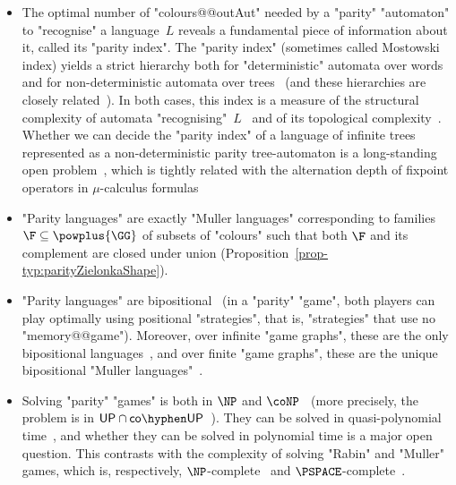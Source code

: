 \documentclass{theoretics}
\begin{document}
\begin{itemize}
	\item The optimal number of "colours@@outAut" needed by a "parity" "automaton"  to "recognise" a language~$L$ reveals a fundamental piece of information about it, called its "parity index". 
	The "parity index" (sometimes called Mostowski index) yields a strict hierarchy both for "deterministic" automata over words and for non-deterministic automata over trees~\cite{Niwinski86Clones,Bradfield98MuHierarchy} (and these hierarchies are closely related~\cite{KSV96Relating,NiwinskiWalukievicz1998Relating}).
	In both cases, this index is a measure of the structural complexity of automata "recognising"~$L$~\cite{Wagner1979omega,NiwinskiWalukievicz1998Relating} and of its topological complexity~\cite{ADMN08Topological, Skrzypczak13Topological}.
	Whether we can decide the "parity index" of a language of infinite trees represented as a non-deterministic parity tree-automaton is a long-standing open problem~\cite{NW05DecidingHierarchy,CL08MostwHierarchy}, which is tightly related with the alternation depth of fixpoint operators in $\mu$-calculus formulas~\cite{Niwinski86Clones}
	
	\item "Parity languages" are exactly "Muller languages" corresponding to families $\F\subseteq \powplus{\GG}$ of subsets of "colours" such that both $\F$ and its complement are closed under union (Proposition~\ref{prop-typ:parityZielonkaShape}).
	\item "Parity languages" are bipositional~\cite{EmersonJutla91Determinacy} (in a "parity" "game", both players can play optimally using positional "strategies", that is, "strategies" that use no "memory@@game"). Moreover, over infinite "game graphs", these are the only bipositional languages~\cite{CN06}, and over finite "game graphs", these are the unique bipositional "Muller languages"~\cite{Zielonka1998infinite}.
	\item Solving "parity" "games" is both in $\NP$ and $\coNP$~\cite{EJS93ModelChecking} (more precisely, the problem is in $\mathsf{UP}\cap\mathsf{co\hyphen UP}$~\cite{Jurdzinski98UP}). They can be solved in quasi-polynomial time~\cite{CJKLS17}, and whether they can be solved in polynomial time is a major open question. This contrasts with the complexity of solving "Rabin" and "Muller" games, which is, respectively, $\NP$-complete~\cite{EmersonJutla99Complexity} and $\PSPACE$-complete~\cite{Dawar2005ComplexityBounds}.
\end{itemize}
\end{document}
